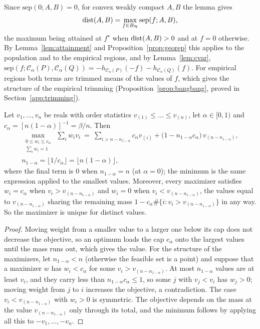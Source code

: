 Since $\mathrm{sep}(0;A,B)=0$, for convex weakly compact $A,B$ the lemma gives
\begin{equation}
\operatorname{dist}(A,B)=\max_{f\in B_{\mathcal{H}}}\mathrm{sep}(f;A,B),
\label{eq:distmax}
\end{equation}
the maximum being attained at $f^\star$ when $\operatorname{dist}(A,B)>0$ and at $f=0$ otherwise. By Lemma~\ref{lem:attainment} and
Proposition~\ref{prop:georep} this applies to the population and to the empirical regions, and by Lemma~\ref{lem:cvar},
$\mathrm{sep}(f;\mathcal C_\alpha(P),\mathcal C_\alpha(Q))=-h_{\mathcal C_\alpha(P)}(-f)-h_{\mathcal C_\alpha(Q)}(f)$. For
empirical regions both terms are trimmed means of the values of $f$, which gives the structure of the empirical
trimming (Proposition~\ref{prop:bangbang}, proved in Section~\ref{app:trimming}).

\begin{lemma}
\label{lem:trimmedmean}
Let $v_1,\dots,v_n$ be reals with order statistics $v_{(1)}\le\dots\le v_{(n)}$, let $\alpha\in[0,1)$ and
$c_\alpha=[n(1-\alpha)]^{-1}=\beta/n$. Then
\begin{gather*}
\max_{\substack{0\le w_i\le c_\alpha\\ \sum_iw_i=1}}\ \sum_iw_iv_i
\ =\ \sum_{i>n-n_{1-\alpha}}c_\alpha v_{(i)}+\big(1-n_{1-\alpha} c_\alpha\big)\,v_{(n-n_{1-\alpha})},\\
n_{1-\alpha}=\lfloor1/c_\alpha\rfloor=\lfloor n(1-\alpha)\rfloor,
\end{gather*}
where the final term is $0$ when $n_{1-\alpha}=n$ (at $\alpha=0$); the minimum is the same expression applied to
the smallest values. Moreover, every maximizer satisfies $w_i=c_\alpha$ when $v_i>v_{(n-n_{1-\alpha})}$ and $w_i=0$ when
$v_i<v_{(n-n_{1-\alpha})}$, the values equal to $v_{(n-n_{1-\alpha})}$ sharing the remaining mass $1-c_\alpha\#\{i:v_i>v_{(n-n_{1-\alpha})}\}$ in any way. So the maximizer is unique for distinct values.
\end{lemma}

\begin{proof}
Moving weight from a smaller value to a larger one below its cap does not decrease the objective, so an optimum loads
the cap $c_\alpha$ onto the largest values until the mass runs out, which gives the value. For the structure of the
maximizers, let $n_{1-\alpha}<n$ (otherwise the feasible set is a point) and suppose that a maximizer $w$ has
$w_i<c_\alpha$ for some $v_i>v_{(n-n_{1-\alpha})}$. At most $n_{1-\alpha}$ values are at least $v_i$, and they carry less than
$n_{1-\alpha} c_\alpha\le1$, so some $j$ with $v_j<v_i$ has $w_j>0$; moving weight from $j$ to $i$ increases the objective,
a contradiction. The case $v_i<v_{(n-n_{1-\alpha})}$ with $w_i>0$ is symmetric. The objective depends on the mass at the
value $v_{(n-n_{1-\alpha})}$ only through its total, and the minimum follows by applying all this to $-v_1,\dots,-v_n$.
\end{proof}

